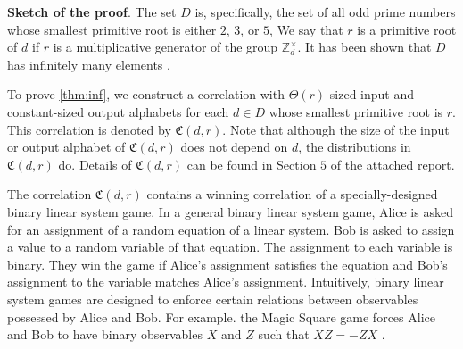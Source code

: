 \documentclass[11pt,letterpaper]{article}
\newcommand{\Z}{\mathbb{Z}}
\newcommand{\Zd}{\Z_d^{\times}}
\newcommand{\1}{\mathbb{1}}
\newcommand{\fC}{\mathfrak{C}}
\newcommand{\hf}[1]{\textcolor{red}{#1}}
\newtheorem{theorem}{Theorem}
\theoremstyle{definition}
\begin{document}
\textbf{Sketch of the proof}.
The set $D$ is, specifically, the set of all 
odd prime numbers whose smallest primitive root 
is either $2$, $3$, or $5$, 
We say that $r$ is a primitive root of $d$ if $r$ is a 
multiplicative generator of the group $\Zd$.
It has been shown that $D$ has infinitely many elements \cite{murty1988}.

To prove \cref{thm:inf}, we construct a correlation with $\Theta(r)$-sized
input and constant-sized output alphabets
for each $d \in D$ whose smallest primitive root is $r$.
This correlation is denoted by $\fC(d,r)$.
Note that although the size of the input or output alphabet of $\fC(d,r)$ does not depend on $d$, 
the distributions in $\fC(d,r)$ do. 
Details of $\fC(d,r)$ can be found in Section $5$ of the attached report.

The correlation $\fC(d,r)$ contains a winning correlation of a specially-designed binary linear system game.  
In a general binary linear system game, Alice is asked for an assignment of a random equation 
of a linear system.
Bob is asked to assign a value to a random variable of that equation.
The assignment to each variable is binary. 
They win the game if Alice's assignment satisfies the equation and Bob's
assignment to the variable matches Alice's assignment.
Intuitively, binary linear system games are designed to enforce certain
relations between observables possessed by Alice and Bob.
For example. the Magic Square game \cite{magic_square} forces
Alice and Bob to have binary observables $X$ and $Z$ such that $XZ = -ZX$ \cite{wu2016, coladan2017}.  
\end{document}
